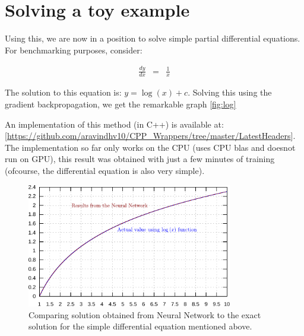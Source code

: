 \section{Solving a toy example}
Using this, we are now in a position to solve simple partial differential
equations. For benchmarking purposes, consider:

\begin{eqnarray*}
\frac{dy}{dx} & = & \frac{1}{x}
\end{eqnarray*}

The solution to this equation is: $y=\log\left(x\right)+c$. Solving
this using the gradient backpropagation, we get the remarkable graph {\autoref{fig:log}}

An implementation of this method (in C++) is available at:
[{\url{https://github.com/aravindhv10/CPP_Wrappers/tree/master/LatestHeaders}}].
The implementation so far only works on the CPU (uses CPU blas and doesnot run on GPU), this result was obtained with just a few minutes of training (ofcourse, the differential equation is also very simple).

\begin{figure}[H]
    \begin{center}
        \includegraphics[width=0.8\textwidth]
        {CompareLog.pdf}
        \caption{
            Comparing solution obtained from Neural Network to the exact solution for the simple differential equation mentioned above.
        }
        \label{fig:log}
    \end{center}
\end{figure}

